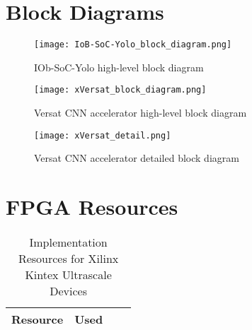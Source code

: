 \documentclass[twocolumn]{iob_pb}
\begin{document}
\section*{\textcolor[rgb]{0,0,0}{Block Diagrams}}

\begin{figure}[H]
  \begin{center}
    \texttt{[image: IoB-SoC-Yolo\_block\_diagram.png]}
    \caption{IOb-SoC-Yolo high-level block diagram}
    \label{fig:IOb-SoC-Yolo}
  \end{center}
\end{figure}


\begin{figure}[H]
  \begin{center}
    \texttt{[image: xVersat\_block\_diagram.png]}
    \caption{Versat CNN accelerator high-level block diagram}
    \label{fig:xVersat_block_diagram}
  \end{center}
\end{figure}

\begin{figure*}[t]
  \begin{center}
    \texttt{[image: xVersat\_detail.png]}
    \caption{Versat CNN accelerator detailed block diagram}
    \label{fig:xVersat_detail}
  \end{center}
\end{figure*}




\section*{FPGA Resources}


\ifnum{}
\begin{table}[H]
  \begin{center}
    \begin{tabular}{|c|c|c|c|}
      \hline

      \rowcolor{iob-green}
      \textbf{Resource}  & \textbf{Used}\\
      \hline
      \hline

  
      
    \end{tabular}
    \caption{Implementation Resources for Xilinx Kintex Ultrascale Devices}
    \label{tab:res}
  \end{center}
\end{table}
\fi
\end{document}
